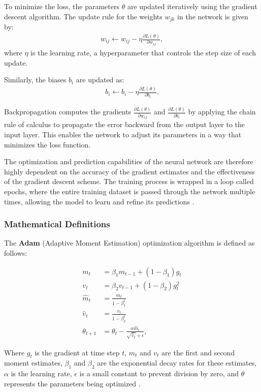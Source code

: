 To minimize the loss, the parameters \(\theta\) are updated iteratively using the gradient descent algorithm. The update rule for the weights \(w_{jk}\) in the network is given by:
\begin{align*}
w_{ij} \leftarrow w_{ij} - \eta \frac{\partial L(\theta)}{\partial w_{ij}},
\end{align*}
where \(\eta\) is the learning rate, a hyperparameter that controls the step size of each update.

Similarly, the biases \(b_i\) are updated as:
\begin{align*}
b_i \leftarrow b_i - \eta \frac{\partial L(\theta)}{\partial b_i}.
\end{align*}

Backpropagation computes the gradients \(\frac{\partial L(\theta)}{\partial w_{ij}}\) and \(\frac{\partial L(\theta)}{\partial b_i}\) by applying the chain rule of calculus to propagate the error backward from the output layer to the input layer. This enables the network to adjust its parameters in a way that minimizes the loss function.

The optimization and prediction capabilities of the neural network are therefore highly dependent on the accuracy of the gradient estimates and the effectiveness of the gradient descent scheme. The training process is wrapped in a loop called epochs, where the entire training dataset is passed through the network multiple times, allowing the model to learn and refine its predictions \citep{bishop2006pattern}.



\subsubsection{Mathematical Definitions}

The \textbf{Adam} (Adaptive Moment Estimation) optimization algorithm is defined as follows:

\begin{align}
m_t &= \beta_1 m_{t-1} + (1 - \beta_1) g_t \\
v_t &= \beta_2 v_{t-1} + (1 - \beta_2) g_t^2 \\
\hat{m}_t &= \frac{m_t}{1 - \beta_1^t} \\
\hat{v}_t &= \frac{v_t}{1 - \beta_2^t} \\
\theta_{t+1} &= \theta_t - \frac{\alpha \hat{m}_t}{\sqrt{\hat{v}_t} + \epsilon}
,
\end{align}

Where \(g_t\) is the gradient at time step \(t\), \(m_t\) and \(v_t\) are the first and second moment estimates, \(\beta_1\) and \(\beta_2\) are the exponential decay rates for these estimates, \(\alpha\) is the learning rate, \(\epsilon\) is a small constant to prevent division by zero, and \(\theta\) represents the parameters being optimized \citep{kingma2014adam}.
\label{Def:Adam}

